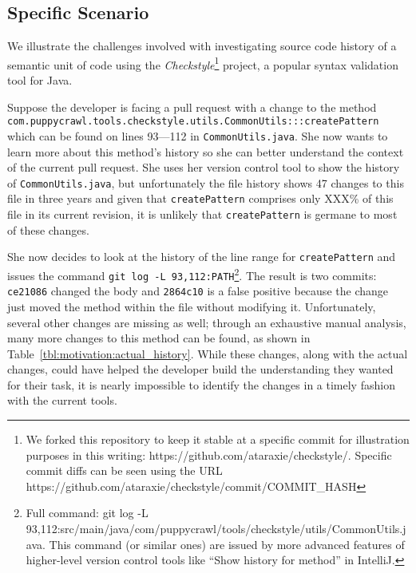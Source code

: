 \subsection{Specific Scenario}
\label{sec:scenario_specific}

We illustrate the challenges involved with investigating source code history of a semantic unit of code using the \textit{Checkstyle}\footnote{We forked this repository to keep it stable at a specific commit for illustration purposes in this writing: https://github.com/ataraxie/checkstyle/. Specific commit diffs can be seen using the URL https://github.com/ataraxie/checkstyle/commit/COMMIT\_HASH} project, a popular syntax validation tool for Java. 

Suppose the developer is facing a pull request with a change to the method \texttt{com.puppycrawl.tools.checkstyle.utils.\-Common\-Utils:::createPattern} which can be found on lines 93---112 in \texttt{CommonUtils.java}. 
She now wants to learn more about this method's history so she can better understand the context of the current pull request.
She uses her version control tool to show the history of \texttt{CommonUtils.java}, but unfortunately the file history shows 47 changes to this file in three years and given that \texttt{createPattern} comprises only XXX\% of this file in its current revision, it is unlikely that \texttt{createPattern} is germane to most of these changes.

She now decides to look at the history of the line range for \texttt{createPattern} and issues the command \texttt{git log -L 93,112:\-PATH}\footnote{Full command: git log -L 93,112:src/main/java/com/puppycrawl/tools/checkstyle/utils/CommonUtils.java. 
This command (or similar ones) are issued by more advanced features of higher-level version control tools like ``Show history for method'' in IntelliJ.}. 
The result is two commits: \texttt{ce21086} changed the body and \texttt{2864c10} is a false positive because the change just moved the method within the file without modifying it. 
Unfortunately, several other changes are missing as well; through an exhaustive manual analysis, many more changes to this method can be found, as shown in Table~\ref{tbl:motivation:actual_history}. 
While these changes, along with the actual changes, could have helped the developer build the understanding they wanted for their task, it is nearly impossible to identify the changes in a timely fashion with the current tools.  

